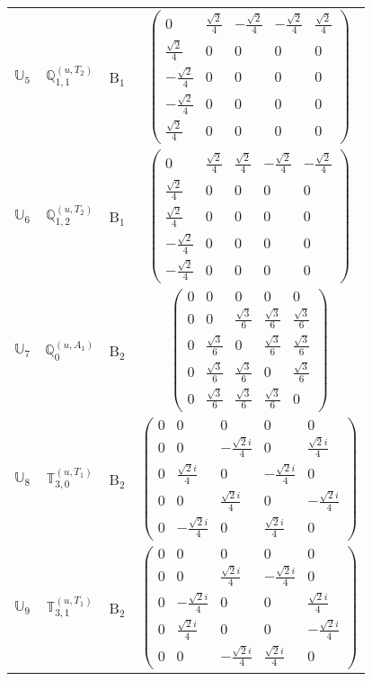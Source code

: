 \documentclass[fleqn,10pt,landscape]{article}
\begin{document}
\begin{itemize}
\begin{center}
\begin{longtable}{c|c|c|c}
$ \mathbb{U}_{5} $ & $\mathbb{Q}_{1,1}^{(u,T_{2})}$ & B$_{1}$ & $\begin{pmatrix} 0 & \frac{\sqrt{2}}{4} & - \frac{\sqrt{2}}{4} & - \frac{\sqrt{2}}{4} & \frac{\sqrt{2}}{4} \\ \frac{\sqrt{2}}{4} & 0 & 0 & 0 & 0 \\ - \frac{\sqrt{2}}{4} & 0 & 0 & 0 & 0 \\ - \frac{\sqrt{2}}{4} & 0 & 0 & 0 & 0 \\ \frac{\sqrt{2}}{4} & 0 & 0 & 0 & 0 \end{pmatrix}$ \\
$ \mathbb{U}_{6} $ & $\mathbb{Q}_{1,2}^{(u,T_{2})}$ & B$_{1}$ & $\begin{pmatrix} 0 & \frac{\sqrt{2}}{4} & \frac{\sqrt{2}}{4} & - \frac{\sqrt{2}}{4} & - \frac{\sqrt{2}}{4} \\ \frac{\sqrt{2}}{4} & 0 & 0 & 0 & 0 \\ \frac{\sqrt{2}}{4} & 0 & 0 & 0 & 0 \\ - \frac{\sqrt{2}}{4} & 0 & 0 & 0 & 0 \\ - \frac{\sqrt{2}}{4} & 0 & 0 & 0 & 0 \end{pmatrix}$ \\ \hline
$ \mathbb{U}_{7} $ & $\mathbb{Q}_{0}^{(u,A_{1})}$ & B$_{2}$ & $\begin{pmatrix} 0 & 0 & 0 & 0 & 0 \\ 0 & 0 & \frac{\sqrt{3}}{6} & \frac{\sqrt{3}}{6} & \frac{\sqrt{3}}{6} \\ 0 & \frac{\sqrt{3}}{6} & 0 & \frac{\sqrt{3}}{6} & \frac{\sqrt{3}}{6} \\ 0 & \frac{\sqrt{3}}{6} & \frac{\sqrt{3}}{6} & 0 & \frac{\sqrt{3}}{6} \\ 0 & \frac{\sqrt{3}}{6} & \frac{\sqrt{3}}{6} & \frac{\sqrt{3}}{6} & 0 \end{pmatrix}$ \\
$ \mathbb{U}_{8} $ & $\mathbb{T}_{3,0}^{(u,T_{1})}$ & B$_{2}$ & $\begin{pmatrix} 0 & 0 & 0 & 0 & 0 \\ 0 & 0 & - \frac{\sqrt{2} i}{4} & 0 & \frac{\sqrt{2} i}{4} \\ 0 & \frac{\sqrt{2} i}{4} & 0 & - \frac{\sqrt{2} i}{4} & 0 \\ 0 & 0 & \frac{\sqrt{2} i}{4} & 0 & - \frac{\sqrt{2} i}{4} \\ 0 & - \frac{\sqrt{2} i}{4} & 0 & \frac{\sqrt{2} i}{4} & 0 \end{pmatrix}$ \\
$ \mathbb{U}_{9} $ & $\mathbb{T}_{3,1}^{(u,T_{1})}$ & B$_{2}$ & $\begin{pmatrix} 0 & 0 & 0 & 0 & 0 \\ 0 & 0 & \frac{\sqrt{2} i}{4} & - \frac{\sqrt{2} i}{4} & 0 \\ 0 & - \frac{\sqrt{2} i}{4} & 0 & 0 & \frac{\sqrt{2} i}{4} \\ 0 & \frac{\sqrt{2} i}{4} & 0 & 0 & - \frac{\sqrt{2} i}{4} \\ 0 & 0 & - \frac{\sqrt{2} i}{4} & \frac{\sqrt{2} i}{4} & 0 \end{pmatrix}$ \\

\end{longtable}
\end{center}
\end{itemize}
\end{document}
